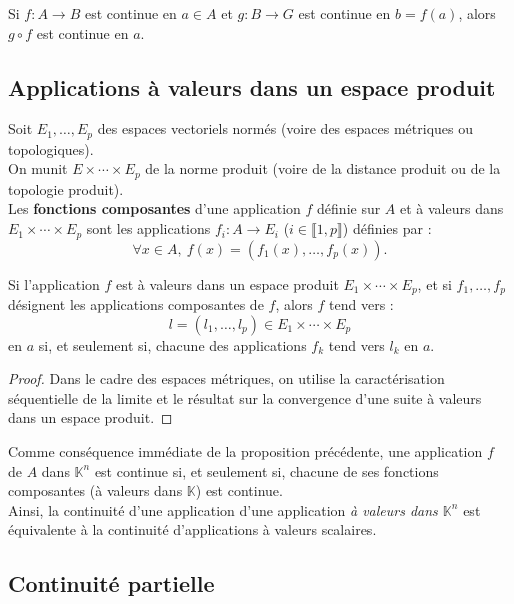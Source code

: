 \documentclass[french]{article}
\newcommand{\K}{\mathbb{K}}
\theoremstyle{plain}
\theoremstyle{definition}
\theoremstyle{remark}
\begin{document}
\begin{cor}%
	Si $f:A\to B$ est continue en $a\in A$ et $g:B\to G$ est continue en $b=f(a)$, alors $g\circ f$ est continue en $a$.
\end{cor}

\subsection{Applications à valeurs dans un espace produit}

Soit $E_1,\ldots,E_p$ des espaces vectoriels normés (voire des espaces métriques ou topologiques).\\
On munit $E\times\cdots\times E_p$ de la norme produit (voire de la distance produit ou de la topologie produit). \\
Les \textbf{fonctions composantes} d'une application $f$ définie sur $A$ et à valeurs dans $E_1\times\cdots\times E_p$ sont les applications $f_i:A\to E_i$ ($i\in\llbracket1,p\rrbracket$) définies par : $$\forall x\in A,\ f(x)=(f_1(x),\ldots,f_p(x)).$$

\begin{prop}
	Si l'application $f$ est à valeurs dans un espace produit $E_1\times\cdots\times E_p$, et si $f_1,\ldots,f_p$ désignent les applications composantes de $f$, alors $f$ tend vers : $$l=(l_1,\ldots,l_p)\in E_1\times\cdots\times E_p$$ en $a$ si, et seulement si, chacune des applications $f_k$ tend vers $l_k$ en $a$.
\end{prop}
\begin{proof}
	Dans le cadre des espaces métriques, on utilise la caractérisation séquentielle de la limite et le résultat sur la convergence d'une suite à valeurs dans un espace produit.
\end{proof}

Comme conséquence immédiate de la proposition précédente, une application $f$ de $A$ dans $\K^n$ est continue si, et seulement si, chacune de ses fonctions composantes (à valeurs dans $\K$) est continue.\\
Ainsi, la continuité d'une application d'une application \textit{à valeurs dans $\K^n$} est équivalente à la continuité d'applications à valeurs scalaires.

\subsection{Continuité partielle}
\end{document}
